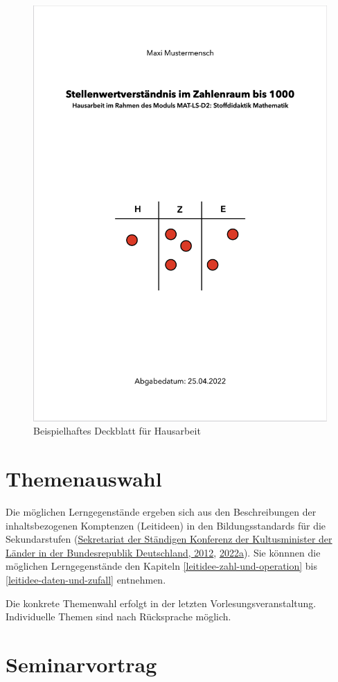 \documentclass[
]{scrbook}
\theoremstyle{definition}
\theoremstyle{definition}
\theoremstyle{definition}
\theoremstyle{definition}
\theoremstyle{remark}
\begin{document}
\begin{figure}

{\centering \includegraphics[width=0.5\linewidth]{pictures/A-BeispielDeckblatt} 

}

\caption{Beispielhaftes Deckblatt für Hausarbeit}\label{fig:BeispielDeckblatt}
\end{figure}

\hypertarget{themenauswahl}{%
\section{Themenauswahl}\label{themenauswahl}}

Die möglichen Lerngegenstände ergeben sich aus den Beschreibungen der inhaltsbezogenen Komptenzen (Leitideen) in den Bildungsstandards für die Sekundarstufen (\protect\hyperlink{ref-KMK:2012}{Sekretariat der Ständigen Konferenz der Kultusminister der Länder in der Bundesrepublik Deutschland, 2012}, \protect\hyperlink{ref-SekretariatderStandigenKonferenzderKultusministerderLanderinderBundesrepublikDeutschland2022}{2022a}). Sie könnnen die möglichen Lerngegenstände den Kapiteln \ref{leitidee-zahl-und-operation} bis \ref{leitidee-daten-und-zufall} entnehmen.

Die konkrete Themenwahl erfolgt in der letzten Vorlesungsveranstaltung. Individuelle Themen sind nach Rücksprache möglich.

\hypertarget{seminarvortrag}{%
\section{Seminarvortrag}\label{seminarvortrag}}
\end{document}
